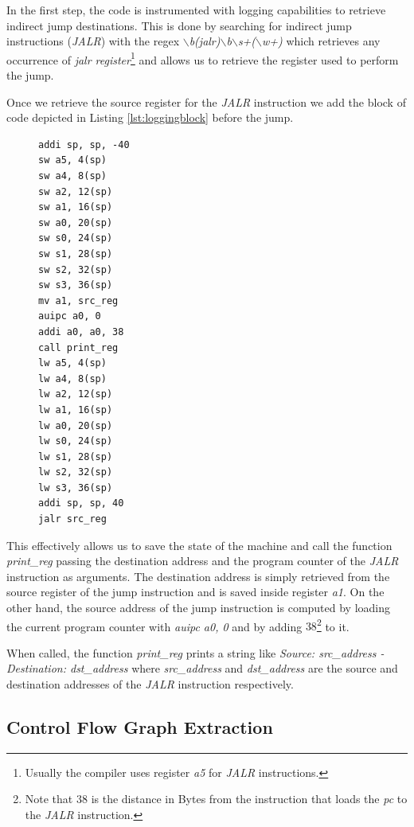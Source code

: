 In the first step, the code is instrumented with logging capabilities to
retrieve indirect jump destinations. This is done by searching for indirect jump
instructions (\textit{JALR}) with the regex \textit{$\backslash$b(jalr)$\backslash$b$\backslash$s+($\backslash$w+)}
which retrieves any occurrence of \textit{jalr register}\footnote{Usually the
compiler uses register \textit{a5} for \textit{JALR} instructions.} and allows us
to retrieve the register used to perform the jump.

Once we retrieve the source register for the \textit{JALR} instruction we add
the block of code depicted in Listing \ref{lst:loggingblock} before the jump.

\begin{figure}
  \setlength{\intextsep}{0pt}
  \begin{minipage}{0.25\textwidth}
    \begin{lstlisting}[style=Assembly, caption = Logging code block, label={lst:loggingblock}]
addi sp, sp, -40
sw a5, 4(sp)
sw a4, 8(sp)
sw a2, 12(sp)
sw a1, 16(sp)
sw a0, 20(sp)
sw s0, 24(sp)
sw s1, 28(sp)
sw s2, 32(sp)
sw s3, 36(sp)
mv a1, src_reg
auipc a0, 0
addi a0, a0, 38
call print_reg
lw a5, 4(sp)
lw a4, 8(sp)
lw a2, 12(sp)
lw a1, 16(sp)
lw a0, 20(sp)
lw s0, 24(sp)
lw s1, 28(sp)
lw s2, 32(sp)
lw s3, 36(sp)
addi sp, sp, 40
jalr src_reg
 \end{lstlisting}
  \end{minipage}
\end{figure}

This effectively allows us to save the state of the machine and call the function
\textit{print\_reg} passing the destination address and the program counter of
the \textit{JALR} instruction as arguments. The destination address is simply
retrieved from the source register of the jump instruction and is saved inside
register \textit{a1}. On the other hand, the source address of the jump instruction
is computed by loading the current program counter with \textit{auipc a0, 0} and
by adding $38$\footnote{Note that $38$ is the distance in Bytes from the
instruction that loads the \textit{pc} to the \textit{JALR} instruction.} to it.

When called, the function \textit{print\_reg} prints a string like \textit{Source:
src\_address - Destination: dst\_address} where \textit{src\_address} and \textit{dst\_address}
are the source and destination addresses of the \textit{JALR} instruction respectively.

\subsection{Control Flow Graph Extraction}
\label{subsec:project_cfgextraction}


